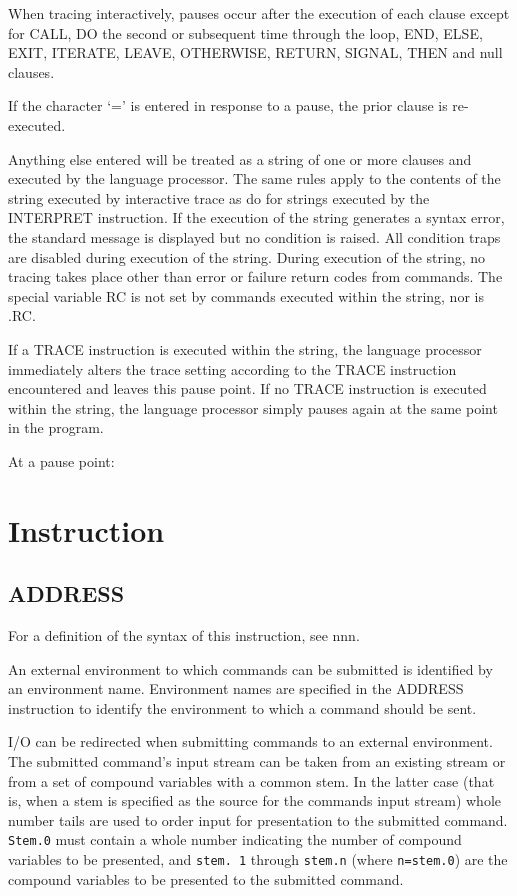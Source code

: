 When tracing interactively, pauses occur after the execution of each
clause except for CALL, DO the second or subsequent time through the
loop, END, ELSE, EXIT, ITERATE, LEAVE, OTHERWISE, RETURN, SIGNAL, THEN
and null clauses.

If the character `=' is entered in response to a pause, the prior clause
is re-executed.

Anything else entered will be treated as a string of one or more clauses
and executed by the language processor. The same rules apply to the
contents of the string executed by interactive trace as do for strings
executed by the INTERPRET instruction. If the execution of the string
generates a syntax error, the standard message is displayed but no
condition is raised. All condition traps are disabled during execution
of the string. During execution of the string, no tracing takes place
other than error or failure return codes from commands. The special
variable RC is not set by commands executed within the string, nor is
.RC.

If a TRACE instruction is executed within the string, the language
processor immediately alters the trace setting according to the TRACE
instruction encountered and leaves this pause point. If no TRACE
instruction is executed within the string, the language processor simply
pauses again at the same point in the program.

At a pause point:



\section{Instruction}\label{instruction}

\subsection{ADDRESS}\label{address}

For a definition of the syntax of this instruction, see nnn.

An external environment to which commands can be submitted is identified
by an environment name. Environment names are specified in the ADDRESS
instruction to identify the environment to which a command should be
sent.

I/O can be redirected when submitting commands to an external
environment. The submitted command's input stream can be taken from an
existing stream or from a set of compound variables with a common stem.
In the latter case (that is, when a stem is specified as the source for
the commands input stream) whole number tails are used to order input
for presentation to the submitted command. \texttt{Stem.0} must contain
a whole number indicating the number of compound variables to be
presented, and \texttt{stem.\ 1} through \texttt{stem.n} (where
\texttt{n=stem.0}) are the compound variables to be presented to the
submitted command.

